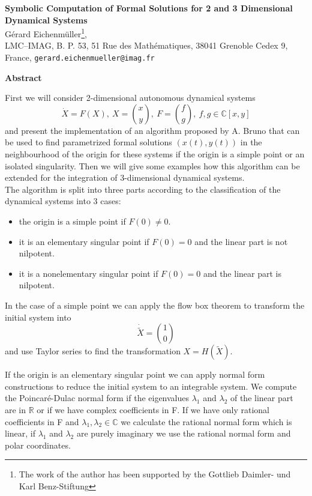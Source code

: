 \documentclass[11p,a4paper]{article}
\newcommand{\R}{{\mathbb R}}
\newcommand{\C}{{\mathbb C}}
\begin{document}
\noindent
{\Large \bf Symbolic Computation of Formal  Solutions
for 2 and 3 Dimensional Dynamical Systems}
\\

\noindent
G\'erard Eichenm\"uller\footnote{The work of the author has 
been supported by the Gottlieb Daimler- und Karl Benz-Stiftung}, \\
\noindent
LMC--IMAG, B. P. 53, 51 Rue des 
Math\'{e}matiques, 38041 Grenoble Cedex 9, France, 
{\tt gerard.eichenmueller@imag.fr}
\\

\begin{center}
{\large \bf Abstract}
\end{center}

\noindent
First we will consider 2-dimensional autonomous dynamical systems 
\begin{equation}\label{sys}
	\dot X = F(X),\ X={x \choose y},\ F={f \choose g},\ f,g\in \C[x,y]
\end{equation}
and present the implementation of an algorithm proposed by A. Bruno 
that can be used
to find parametrized formal solutions $(x(t),y(t))$ 
in the neighbourhood of the origin 
for these systems if the origin is a simple point or an isolated singularity.
Then we will give some examples how this algorithm can be extended
for the integration of 3-dimensional dynamical systems.
\\

The algorithm is split into three parts according to the classification 
of the dynamical systems into 3 cases:
\begin{itemize}
\item    the origin is a simple point if $F(0)\neq 0$. 
\item    it is an elementary singular point if $F(0)= 0$ and the linear 
part is not nilpotent.
\item    it is a nonelementary singular point if $F(0)= 0$ and the linear 
part is nilpotent.
\end{itemize}
In the case of a simple point we can apply the flow box theorem to transform 
the initial system into 
\[
     \dot {\tilde X}= {1 \choose 0}
\]
and use Taylor series to find the transformation $X=H(\tilde X)$.

If the origin is an elementary singular point we can apply normal 
form constructions to
reduce the initial system to an integrable system. We compute the 
Poincar\'e-Dulac normal form if the eigenvalues $\lambda_1$ and 
$\lambda_2$ of the linear part are in $\R$ or if we have complex 
coefficients in F. If we have only rational coefficients in F and 
$\lambda_1,\lambda_2 \in \C$ we calculate the rational normal form 
which is linear, 
if $\lambda_1$ and $\lambda_2$ are purely imaginary we use 
the rational normal form and polar coordinates.
\end{document}
